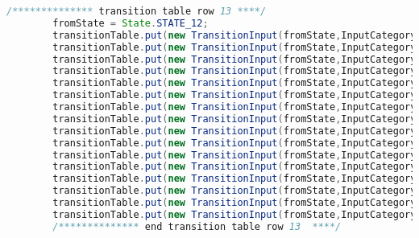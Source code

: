 \begin{lstlisting}[basicstyle=\miniscule,language=Java,caption=Implementation of transition table,label=listing:transition table]
		/************** transition table row 13 ****/
		fromState = State.STATE_12;
		transitionTable.put(new TransitionInput(fromState,InputCategory.LETTER), State.STATE_ERROR);
		transitionTable.put(new TransitionInput(fromState,InputCategory.DIGIT), State.STATE_13);
		transitionTable.put(new TransitionInput(fromState,InputCategory.UNDERSCORE), State.STATE_ERROR);
		transitionTable.put(new TransitionInput(fromState,InputCategory.SLASH_DIVIDE), State.STATE_ERROR);
		transitionTable.put(new TransitionInput(fromState,InputCategory.ASTERISK), State.STATE_ERROR);
		transitionTable.put(new TransitionInput(fromState,InputCategory.LESS_THAN), State.STATE_ERROR);
		transitionTable.put(new TransitionInput(fromState,InputCategory.GREATER_THAN), State.STATE_ERROR);
		transitionTable.put(new TransitionInput(fromState,InputCategory.PLUS), State.STATE_ERROR);
		transitionTable.put(new TransitionInput(fromState,InputCategory.HYPHEN_MINUS), State.STATE_ERROR);
		transitionTable.put(new TransitionInput(fromState,InputCategory.EQUAL), State.STATE_ERROR);
		transitionTable.put(new TransitionInput(fromState,InputCategory.EXCLAMATION_MARK), State.STATE_ERROR);
		transitionTable.put(new TransitionInput(fromState,InputCategory.DOT), State.STATE_ERROR);
		transitionTable.put(new TransitionInput(fromState,InputCategory.SINGLE_QUOTE), State.STATE_ERROR);
		transitionTable.put(new TransitionInput(fromState,InputCategory.PUNCT), State.STATE_ERROR);
		transitionTable.put(new TransitionInput(fromState,InputCategory.OTHER_PRINTABLE), State.STATE_ERROR);
		transitionTable.put(new TransitionInput(fromState,InputCategory.LINE_FEED), State.STATE_ERROR);
		/************** end transition table row 13  ****/
		

\end{lstlisting}

